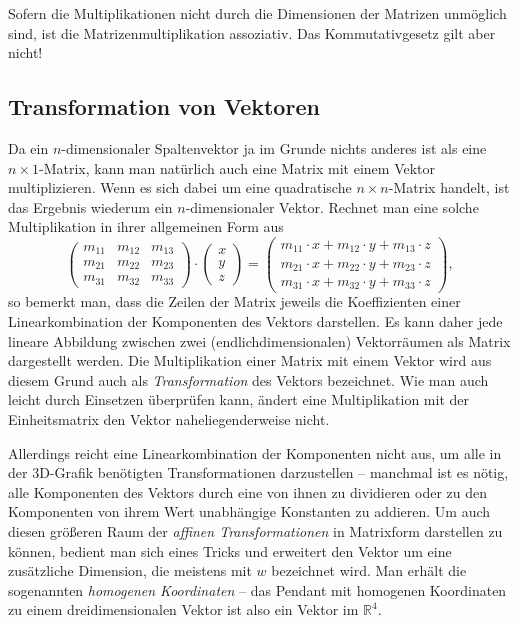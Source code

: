 Sofern die Multiplikationen nicht durch die Dimensionen der Matrizen unmöglich sind, ist die Matrizenmultiplikation assoziativ. Das Kommutativgesetz gilt aber nicht! 

\subsection{Transformation von Vektoren}
Da ein $n$-dimensionaler Spaltenvektor ja im Grunde nichts anderes ist als eine $n \times 1$-Matrix, kann man natürlich auch eine Matrix mit einem Vektor multiplizieren. Wenn es sich dabei um eine quadratische $n \times n$-Matrix handelt, ist das Ergebnis wiederum ein $n$-dimensionaler Vektor. Rechnet man eine solche Multiplikation in ihrer allgemeinen Form aus
\begin{equation}
 \begin{pmatrix}
  m_{11} & m_{12} & m_{13} \\
  m_{21} & m_{22} & m_{23} \\
  m_{31} & m_{32} & m_{33}
 \end{pmatrix} \cdot
 \begin{pmatrix}
  x \\ y \\ z
 \end{pmatrix} =
 \begin{pmatrix}
  m_{11} \cdot x + m_{12} \cdot y + m_{13} \cdot z \\
  m_{21} \cdot x + m_{22} \cdot y + m_{23} \cdot z \\
  m_{31} \cdot x + m_{32} \cdot y + m_{33} \cdot z
 \end{pmatrix},
\end{equation}
so bemerkt man, dass die Zeilen der Matrix jeweils die Koeffizienten einer Linearkombination der Komponenten des Vektors darstellen. Es kann daher jede lineare Abbildung zwischen zwei (endlichdimensionalen) Vektorräumen als Matrix dargestellt werden. Die Multiplikation einer Matrix mit einem Vektor wird aus diesem Grund auch als \emph{Transformation} des Vektors bezeichnet. Wie man auch leicht durch Einsetzen überprüfen kann, ändert eine Multiplikation mit der Einheitsmatrix den Vektor naheliegenderweise nicht.

\label{homogeneouscoordinates}
Allerdings reicht eine Linearkombination der Komponenten nicht aus, um alle in der 3D-Grafik benötigten Transformationen darzustellen -- manchmal ist es nötig, alle Komponenten des Vektors durch eine von ihnen zu dividieren oder zu den Komponenten von ihrem Wert unabhängige Konstanten zu addieren. Um auch diesen größeren Raum der \emph{affinen Transformationen} in Matrixform darstellen zu können, bedient man sich eines Tricks und erweitert den Vektor um eine zusätzliche Dimension, die meistens mit $w$ bezeichnet wird. Man erhält die sogenannten \emph{homogenen Koordinaten} -- das Pendant mit homogenen Koordinaten zu einem dreidimensionalen Vektor ist also ein Vektor im $\mathbb{R}^4$.


